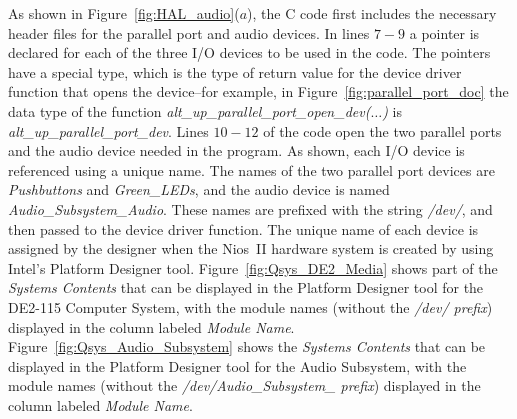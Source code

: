 \documentclass[11pt, twoside, pdftex]{article}
\begin{document}
\noindent
As shown in Figure~\ref{fig:HAL_audio}($a$), the C code first includes the necessary header files for the parallel
port and audio devices. In lines $7 - 9$ a pointer is declared for each of the three I/O devices to be used in
the code. The pointers have a special type, which is the type of return value for the device driver function that opens
the device--for example, in Figure~\ref{fig:parallel_port_doc} the data type of the 
function {\it alt\_up\_parallel\_port\_open\_dev($\ldots$)} is {\it alt\_up\_parallel\_port\_dev}. Lines $10-12$
of the code open the two parallel ports and the audio device needed in the program. As shown, each I/O
device is referenced using a unique name. The names of the two parallel port devices are {\it Pushbuttons} and 
{\it Green\_LEDs}, and the audio device is named {\it Audio\_Subsystem\_Audio}. These names are prefixed with the string
{\it /dev/}, and then passed to the device driver function. The unique name of each device is assigned by the
designer when the Nios~II hardware system is created by using Intel's Platform Designer tool.
Figure~\ref{fig:Qsys_DE2_Media} shows part of the {\it Systems Contents} that can be displayed in the Platform Designer 
tool for the DE2-115 Computer System, with the module names (without the {\it /dev/ prefix}) displayed in the column 
labeled {\it Module Name}. Figure~\ref{fig:Qsys_Audio_Subsystem} shows the {\it Systems Contents} that can be displayed in the Platform Designer 
tool for the Audio Subsystem, with the module names (without the {\it /dev/Audio\_Subsystem\_ prefix}) displayed in the column labeled {\it Module Name}.
\end{document}
